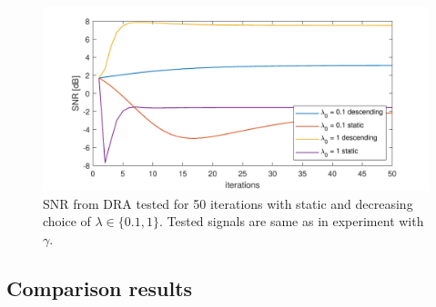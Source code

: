 \documentclass[conference]{IEEEtran}
\newcommand{\todo}[1]{\textcolor{red}{#1}}
\begin{document}
\begin{figure}[!h]
	\centering
	\includegraphics[width=1\linewidth]{figures/lamda_desc}
	\caption{SNR from DRA tested for 50 iterations with static and decreasing choice of $\lambda \in \{0.1,1 \}$.
	Tested signals are same as in experiment with $\gamma$.}
	\label{fig:lamdadesc}
\end{figure}




\subsection{Comparison results}
\end{document}
